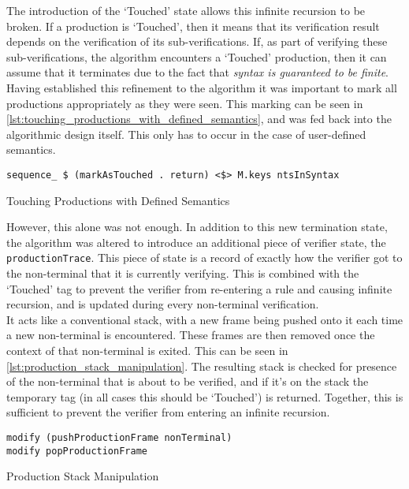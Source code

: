 The introduction of the `Touched' state allows this infinite recursion to be broken. 
If a production is `Touched', then it means that its verification result depends on the verification of its sub-verifications.
If, as part of verifying these sub-verifications, the algorithm encounters a `Touched' production, then it can assume that it terminates due to the fact that \textit{syntax is guaranteed to be finite}. \\

Having established this refinement to the algorithm it was important to mark all productions appropriately as they were seen.
This marking can be seen in \autoref{lst:touching_productions_with_defined_semantics}, and was fed back into the algorithmic design itself. 
This only has to occur in the case of user-defined semantics.

\begin{listing}[!htb]
\begin{verbatim}
sequence_ $ (markAsTouched . return) <$> M.keys ntsInSyntax
\end{verbatim}
\caption{Touching Productions with Defined Semantics}
\label{lst:touching_productions_with_defined_semantics}
\end{listing}

However, this alone was not enough. 
In addition to this new termination state, the algorithm was altered to introduce an additional piece of verifier state, the \texttt{productionTrace}.
This piece of state is a record of exactly how the verifier got to the non-terminal that it is currently verifying.
This is combined with the `Touched' tag to prevent the verifier from re-entering a rule and causing infinite recursion, and is updated during every non-terminal verification.\\

It acts like a conventional stack, with a new frame being pushed onto it each time a new non-terminal is encountered.
These frames are then removed once the context of that non-terminal is exited.
This can be seen in \autoref{lst:production_stack_manipulation}.
The resulting stack is checked for presence of the non-terminal that is about to be verified, and if it's on the stack the temporary tag (in all cases this should be `Touched') is returned.
Together, this is sufficient to prevent the verifier from entering an infinite recursion.

\begin{listing}[!htb]
\begin{verbatim}
modify (pushProductionFrame nonTerminal)
modify popProductionFrame
\end{verbatim}
\caption{Production Stack Manipulation}
\label{lst:production_stack_manipulation}
\end{listing}

